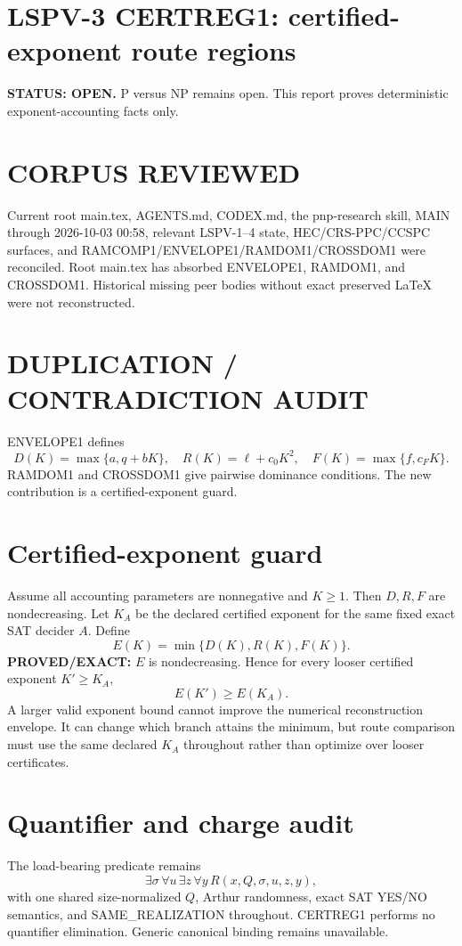 \documentclass[11pt]{article}
\begin{document}
\section*{LSPV-3 CERTREG1: certified-exponent route regions}
\textbf{STATUS: OPEN.} P versus NP remains open. This report proves deterministic exponent-accounting facts only.

\section*{CORPUS REVIEWED}
Current root main.tex, AGENTS.md, CODEX.md, the pnp-research skill, MAIN through 2026-10-03 00:58, relevant LSPV-1--4 state, HEC/CRS-PPC/CCSPC surfaces, and RAMCOMP1/ENVELOPE1/RAMDOM1/CROSSDOM1 were reconciled. Root main.tex has absorbed ENVELOPE1, RAMDOM1, and CROSSDOM1. Historical missing peer bodies without exact preserved LaTeX were not reconstructed.

\section*{DUPLICATION / CONTRADICTION AUDIT}
ENVELOPE1 defines
\[
D(K)=\max\{a,q+bK\},\quad R(K)=\ell+c_0K^2,\quad F(K)=\max\{f,c_FK\}.
\]
RAMDOM1 and CROSSDOM1 give pairwise dominance conditions. The new contribution is a certified-exponent guard.

\section*{Certified-exponent guard}
Assume all accounting parameters are nonnegative and \(K\ge1\). Then \(D,R,F\) are nondecreasing. Let \(K_A\) be the declared certified exponent for the same fixed exact SAT decider \(A\). Define
\[
E(K)=\min\{D(K),R(K),F(K)\}.
\]
\textbf{PROVED/EXACT:} \(E\) is nondecreasing. Hence for every looser certified exponent \(K'\ge K_A\),
\[
E(K')\ge E(K_A).
\]
A larger valid exponent bound cannot improve the numerical reconstruction envelope. It can change which branch attains the minimum, but route comparison must use the same declared \(K_A\) throughout rather than optimize over looser certificates.

\section*{Quantifier and charge audit}
The load-bearing predicate remains
\[
\exists\sigma\,\forall u\,\exists z\,\forall y\,R(x,Q,\sigma,u,z,y),
\]
with one shared size-normalized \(Q\), Arthur randomness, exact SAT YES/NO semantics, and SAME\_REALIZATION throughout. CERTREG1 performs no quantifier elimination. Generic canonical binding remains unavailable.
\end{document}
